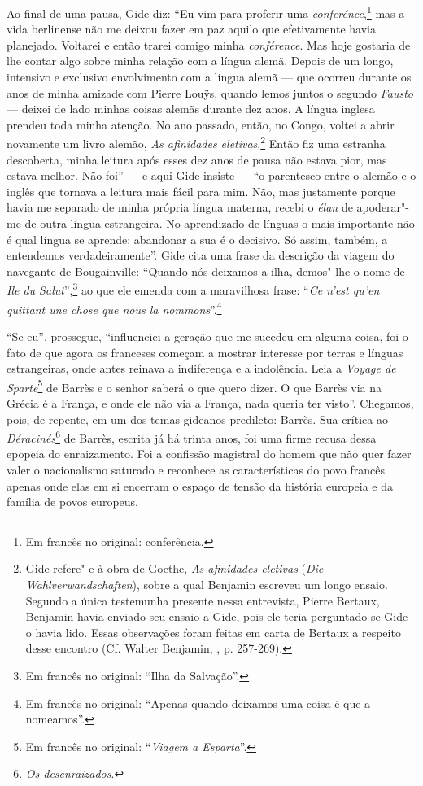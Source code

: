 Ao final de uma pausa, Gide diz: ``Eu vim para proferir uma
\emph{conferénce},\footnote{Em francês no original: conferência. \versal{[N. T.]}} mas a vida
berlinense não me deixou fazer em paz aquilo que efetivamente havia
planejado. Voltarei e então trarei comigo minha \emph{conférence}. Mas
hoje gostaria de lhe contar algo sobre minha relação com a língua alemã.
Depois de um longo, intensivo e exclusivo envolvimento com a língua
alemã --- que ocorreu durante os anos de minha amizade com Pierre Louÿs,
quando lemos juntos o segundo \emph{Fausto} --- deixei de lado minhas
coisas alemãs durante dez anos. A língua inglesa prendeu toda minha
atenção. No ano passado, então, no Congo, voltei a abrir novamente um
livro alemão, \emph{As afinidades eletivas}.\footnote{Gide
  refere"-e à obra de Goethe, \emph{As afinidades eletivas} (\emph{Die
  Wahlverwandschaften}), sobre a qual Benjamin escreveu um longo ensaio.
  Segundo a única testemunha presente nessa entrevista, Pierre Bertaux,
  Benjamin havia enviado seu ensaio a Gide, pois ele teria perguntado se
  Gide o havia lido. Essas observações foram feitas em carta de Bertaux
  a respeito desse encontro (Cf. Walter Benjamin, ,
  p. 257-269). \versal{[N. T.]}} Então fiz uma estranha descoberta, minha leitura após esses
dez anos de pausa não estava pior, mas estava melhor. Não foi'' --- e aqui
Gide insiste --- ``o parentesco entre o alemão e o inglês que tornava a
leitura mais fácil para mim. Não, mas justamente porque havia me
separado de minha própria língua materna, recebi o \emph{élan} de
apoderar"-me de outra língua estrangeira. No aprendizado de línguas o
mais importante não é qual língua se aprende; abandonar a sua é o
decisivo. Só assim, também, a entendemos verdadeiramente''. Gide cita
uma frase da descrição da viagem do navegante de Bougainville: ``Quando
nós deixamos a ilha, demos"-lhe o nome de \emph{Ile du Salut}'',\footnote{Em francês no original: ``Ilha da Salvação''. \versal{[N. T.]}} ao que ele emenda com a maravilhosa
frase: ``\emph{Ce n'est qu'en quittant une chose que nous la
nommons}''.\footnote{Em francês no original: ``Apenas quando deixamos uma coisa é que a
  nomeamos''. \versal{[N. T.]}}

``Se eu'', prossegue, ``influenciei a geração que me sucedeu em alguma
coisa, foi o fato de que agora os franceses começam a mostrar interesse
por terras e línguas estrangeiras, onde antes reinava a indiferença e a
indolência. Leia a \emph{Voyage de Sparte}\footnote{Em francês no original: ``\emph{Viagem
  a Esparta}''. \versal{[N. T.]}} de Barrès e o senhor saberá o que quero dizer. O que
Barrès via na Grécia é a França, e onde ele não via a França, nada
queria ter visto''. Chegamos, pois, de repente, em um dos temas gideanos
predileto: Barrès. Sua crítica ao \emph{Déracinés}\footnote{\emph{Os desenraizados}. \versal{[N. T.]}} de Barrès, escrita já há trinta anos, foi uma firme recusa dessa
epopeia do enraizamento. Foi a confissão magistral do homem que não quer
fazer valer o nacionalismo saturado e reconhece as características do
povo francês apenas onde elas em si encerram o espaço de tensão da
história europeia e da família de povos europeus.

